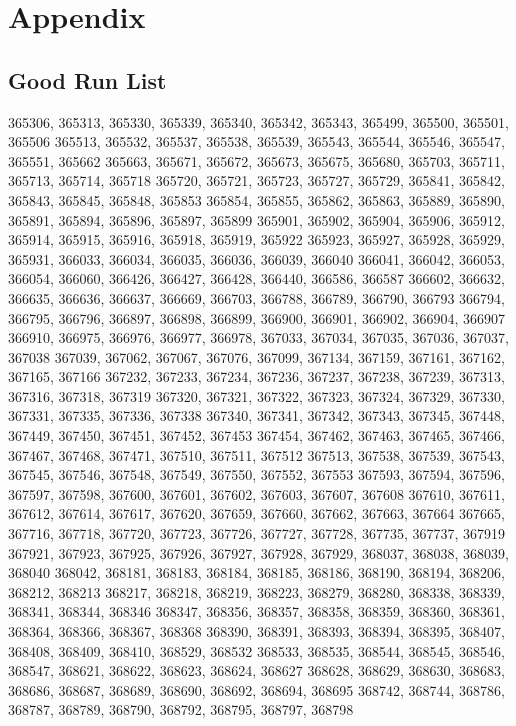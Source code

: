 \documentclass[12pt]{article}
\begin{document}
\section{Appendix}

\subsection{Good Run List}

365306, 365313, 365330, 365339, 365340, 365342, 365343, 365499, 365500, 365501, 365506
365513, 365532, 365537, 365538, 365539, 365543, 365544, 365546, 365547, 365551, 365662
365663, 365671, 365672, 365673, 365675, 365680, 365703, 365711, 365713, 365714, 365718
365720, 365721, 365723, 365727, 365729, 365841, 365842, 365843, 365845, 365848, 365853
365854, 365855, 365862, 365863, 365889, 365890, 365891, 365894, 365896, 365897, 365899
365901, 365902, 365904, 365906, 365912, 365914, 365915, 365916, 365918, 365919, 365922
365923, 365927, 365928, 365929, 365931, 366033, 366034, 366035, 366036, 366039, 366040
366041, 366042, 366053, 366054, 366060, 366426, 366427, 366428, 366440, 366586, 366587
366602, 366632, 366635, 366636, 366637, 366669, 366703, 366788, 366789, 366790, 366793
366794, 366795, 366796, 366897, 366898, 366899, 366900, 366901, 366902, 366904, 366907
366910, 366975, 366976, 366977, 366978, 367033, 367034, 367035, 367036, 367037, 367038
367039, 367062, 367067, 367076, 367099, 367134, 367159, 367161, 367162, 367165, 367166
367232, 367233, 367234, 367236, 367237, 367238, 367239, 367313, 367316, 367318, 367319
367320, 367321, 367322, 367323, 367324, 367329, 367330, 367331, 367335, 367336, 367338
367340, 367341, 367342, 367343, 367345, 367448, 367449, 367450, 367451, 367452, 367453
367454, 367462, 367463, 367465, 367466, 367467, 367468, 367471, 367510, 367511, 367512
367513, 367538, 367539, 367543, 367545, 367546, 367548, 367549, 367550, 367552, 367553
367593, 367594, 367596, 367597, 367598, 367600, 367601, 367602, 367603, 367607, 367608
367610, 367611, 367612, 367614, 367617, 367620, 367659, 367660, 367662, 367663, 367664
367665, 367716, 367718, 367720, 367723, 367726, 367727, 367728, 367735, 367737, 367919
367921, 367923, 367925, 367926, 367927, 367928, 367929, 368037, 368038, 368039, 368040
368042, 368181, 368183, 368184, 368185, 368186, 368190, 368194, 368206, 368212, 368213
368217, 368218, 368219, 368223, 368279, 368280, 368338, 368339, 368341, 368344, 368346
368347, 368356, 368357, 368358, 368359, 368360, 368361, 368364, 368366, 368367, 368368
368390, 368391, 368393, 368394, 368395, 368407, 368408, 368409, 368410, 368529, 368532
368533, 368535, 368544, 368545, 368546, 368547, 368621, 368622, 368623, 368624, 368627
368628, 368629, 368630, 368683, 368686, 368687, 368689, 368690, 368692, 368694, 368695
368742, 368744, 368786, 368787, 368789, 368790, 368792, 368795, 368797, 368798
\end{document}
